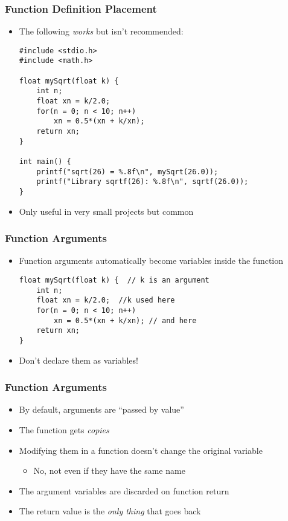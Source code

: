 \documentclass[14pt]{beamer}
\begin{document}
\begin{frame}[fragile]
\frametitle{Function Definition Placement}
\begin{itemize}
\item The following \textit{works} but isn't recommended:
\begin{lstlisting}[style=CStyle,basicstyle=\ttfamily\scriptsize]
#include <stdio.h> 
#include <math.h> 

float mySqrt(float k) { 
	int n; 
	float xn = k/2.0; 
	for(n = 0; n < 10; n++) 
		xn = 0.5*(xn + k/xn); 
	return xn; 
}

int main() { 
	printf("sqrt(26) = %.8f\n", mySqrt(26.0)); 
	printf("Library sqrtf(26): %.8f\n", sqrtf(26.0)); 
}
\end{lstlisting}
\item Only useful in very small projects but common
\end{itemize}
\end{frame}

\begin{frame}[fragile]
\frametitle{Function Arguments}
\begin{itemize}
\item Function arguments automatically become variables inside the function
\begin{lstlisting}[style=CStyle]
float mySqrt(float k) {  // k is an argument
	int n; 
	float xn = k/2.0;  //k used here
	for(n = 0; n < 10; n++) 
		xn = 0.5*(xn + k/xn); // and here
	return xn; 
}
\end{lstlisting}
\item Don't declare them as variables!
\end{itemize}
\end{frame}

\begin{frame}
\frametitle{Function Arguments}
\begin{itemize}
\item By default, arguments are ``passed by value''
\item The function gets \textit{copies}
\item Modifying them in a function doesn't change the original variable
	\begin{itemize}
		\item No, not even if they have the same name
	\end{itemize}
\item The argument variables are discarded on function return
\item The return value is the \textit{only thing} that goes back
\end{itemize}
\end{frame}
\end{document}
